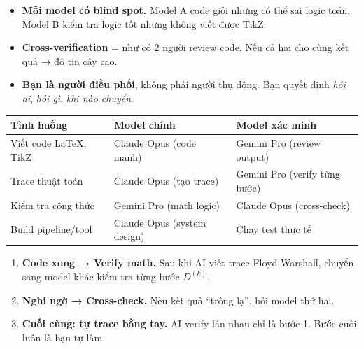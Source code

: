 \documentclass[11pt]{article}
\begin{document}
\begin{insightbox}
\begin{itemize}[leftmargin=1.2em, itemsep=3pt]
  \item \textbf{Mỗi model có blind spot.} Model A code giỏi nhưng có thể sai logic toán. Model B kiểm tra logic tốt nhưng không viết được TikZ.
  \item \textbf{Cross-verification} = như có 2 người review code. Nếu cả hai cho cùng kết quả → độ tin cậy cao.
  \item \textbf{Bạn là người điều phối}, không phải người thụ động. Bạn quyết định \textit{hỏi ai}, \textit{hỏi gì}, \textit{khi nào chuyển}.
\end{itemize}
\end{insightbox}

\begin{center}
{\small
\begin{tabular}{|>{\raggedright\arraybackslash}p{3cm}|>{\raggedright\arraybackslash}p{5cm}|>{\raggedright\arraybackslash}p{5cm}|}
\hline
\textbf{Tình huống} & \textbf{Model chính} & \textbf{Model xác minh} \\
\hline\hline
Viết code LaTeX, TikZ & Claude Opus (code mạnh) & Gemini Pro (review output) \\
\hline
Trace thuật toán & Claude Opus (tạo trace) & Gemini Pro (verify từng bước) \\
\hline
Kiểm tra công thức & Gemini Pro (math logic) & Claude Opus (cross-check) \\
\hline
Build pipeline/tool & Claude Opus (system design) & Chạy test thực tế \\
\hline
\end{tabular}
}
\label{tab:multi-model}
\end{center}

\begin{tipbox}
\begin{enumerate}[leftmargin=1.5em, itemsep=2pt]
  \item \textbf{Code xong → Verify math.} Sau khi AI viết trace Floyd-Warshall, chuyển sang model khác kiểm tra từng bước $D^{(k)}$.
  \item \textbf{Nghi ngờ → Cross-check.} Nếu kết quả ``trông lạ'', hỏi model thứ hai.
  \item \textbf{Cuối cùng: tự trace bằng tay.} AI verify lẫn nhau chỉ là bước 1. Bước cuối luôn là bạn tự làm.
\end{enumerate}
\end{tipbox}
\end{document}
